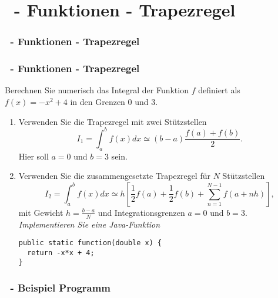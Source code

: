 \def\stitle{\theexercise\ - Funktionen - Trapezregel}
\section{\stitle}
\begin{frame}
  \frametitle{\stitle}%
\tableofcontents[current]
\end{frame}


\begin{frame}[fragile]%
    \frametitle{\stitle}

Berechnen Sie numerisch das Integral der Funktion $f$ definiert als $f(x) = -x^2+4$ in den Grenzen $0$ und $3$.
\begin{enumerate}
\item Verwenden Sie die Trapezregel mit zwei St\"utzstellen
\[
I_1
= \int_a^b f(x)dx
\simeq (b-a)\frac{f(a)+f(b)}{2}
.\]
Hier soll $a=0$ und $b=3$ sein.
\item Verwenden Sie die zusammengesetzte Trapezregel für $N$ St\"utzstellen
\[
I_2
= \int_a^b f(x)dx
\simeq h \left[\frac{1}{2}f(a)+\frac{1}{2}f(b)+\sum_{n=1}^{N-1}f\left(a+nh \right)\right]
,\]
mit Gewicht $h = \frac{b-a}{N}$ und Integrationsgrenzen $a=0$ und $b=3$.
\emph{Implementieren Sie eine Java-Funktion}

\begin{lstlisting}[style=Java]
public static function(double x) {
  return -x*x + 4;
}
\end{lstlisting}
\end{enumerate}


\end{frame}

\begin{frame}[t]%
  \frametitle{\theexercise\ - Beispiel Programm}%


\end{frame}
